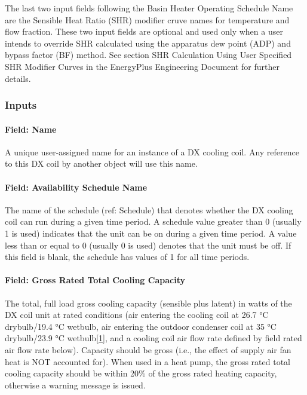 The last two input fields following the Basin Heater Operating Schedule Name are the Sensible Heat Ratio (SHR) modifier cruve names for temperature and flow fraction. These two input fields are optional and used only when a user intends to override SHR calculated using the apparatus dew point (ADP) and bypass factor (BF) method. See section SHR Calculation Using User Specified SHR Modifier Curves in the EnergyPlus Engineering Document for further details.

\subsubsection{Inputs}\label{inputs-13-004}

\paragraph{Field: Name}\label{field-name-12-003}

A unique user-assigned name for an instance of a DX cooling coil. Any reference to this DX coil by another object will use this name.

\paragraph{Field: Availability Schedule Name}\label{field-availability-schedule-name-6-001}

The name of the schedule (ref: Schedule) that denotes whether the DX cooling coil can run during a given time period. A schedule value greater than 0 (usually 1 is used) indicates that the unit can be on during a given time period. A value less than or equal to 0 (usually 0 is used) denotes that the unit must be off. If this field is blank, the schedule has values of 1 for all time periods.

\paragraph{Field: Gross Rated Total Cooling Capacity}\label{field-gross-rated-total-cooling-capacity-1}

The total, full load gross cooling capacity (sensible plus latent) in watts of the DX coil unit at rated conditions (air entering the cooling coil at 26.7 °C drybulb/19.4 °C wetbulb, air entering the outdoor condenser coil at 35 °C drybulb/23.9 °C wetbulb\protect\hyperlink{ux5fftn1}{{[}1{]}}, and a cooling coil air flow rate defined by field rated air flow rate below). Capacity should be gross (i.e., the effect of supply air fan heat is NOT accounted for). When used in a heat pump, the gross rated total cooling capacity should be within 20\% of the gross rated heating capacity, otherwise a warning message is issued.

